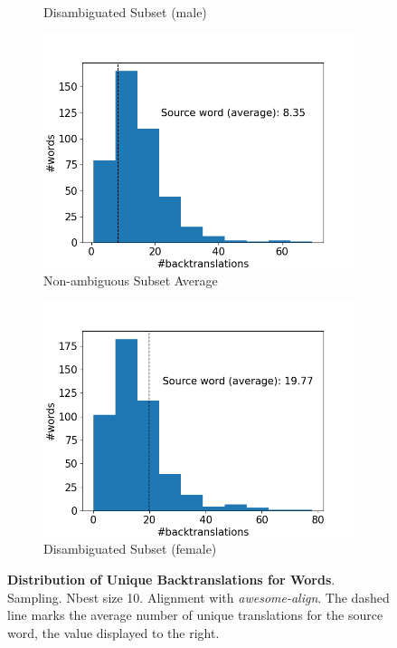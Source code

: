 \begin{figure}[!htb]
\begin{subfigure}{0.49\textwidth}
         \caption{Disambiguated Subset (male)}
     \end{subfigure}
     \begin{subfigure}{0.49\textwidth}
         \centering
         \includegraphics[width=\textwidth]{figures/alignment/align_sampling/word_backtranslations_average.png}
         \caption{Non-ambiguous Subset Average}
     \end{subfigure}
     \hfill
     \begin{subfigure}{0.49\textwidth}
         \centering
         \includegraphics[width=\textwidth]{figures/alignment/align_sampling/word_backtranslations_female.png}
         \caption{Disambiguated Subset (female)}
     \end{subfigure}
        \caption[Distribution of Unique Backtranslations for Words: Sampling]{\textbf{Distribution of Unique Backtranslations for Words}. Sampling. Nbest size 10. Alignment with \textit{awesome-align}. The dashed line marks the average number of unique translations for the source word, the value displayed to the right.}
        \label{fig:alignment_graphs_backtranslation_sampling}

\end{figure}
